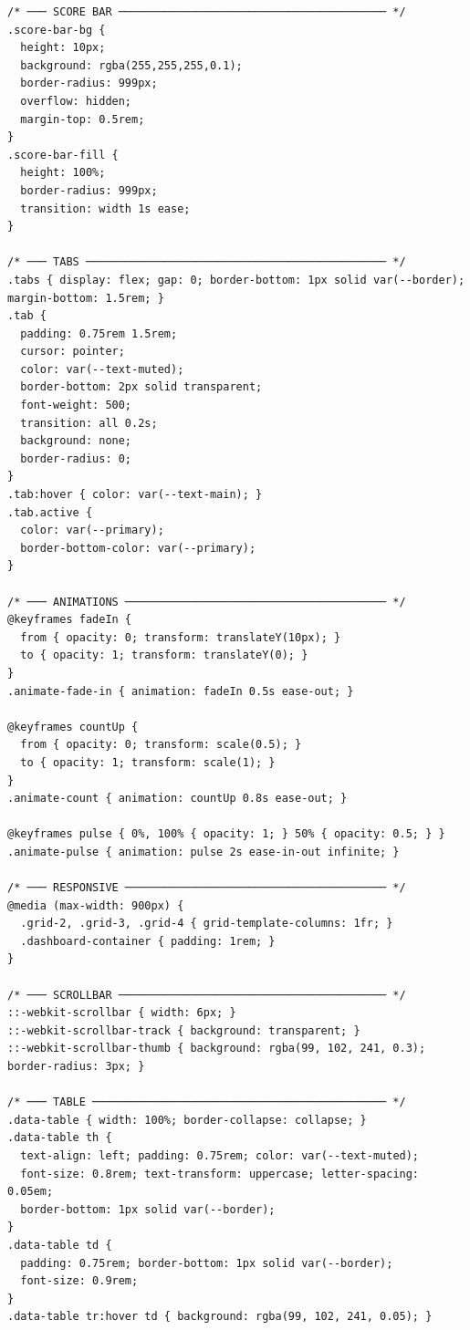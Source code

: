 \documentclass[12pt,a4paper]{report}
\begin{document}
\begin{verbatim}
/* ─── SCORE BAR ───────────────────────────────────────── */
.score-bar-bg {
  height: 10px;
  background: rgba(255,255,255,0.1);
  border-radius: 999px;
  overflow: hidden;
  margin-top: 0.5rem;
}
.score-bar-fill {
  height: 100%;
  border-radius: 999px;
  transition: width 1s ease;
}

/* ─── TABS ────────────────────────────────────────────── */
.tabs { display: flex; gap: 0; border-bottom: 1px solid var(--border); margin-bottom: 1.5rem; }
.tab {
  padding: 0.75rem 1.5rem;
  cursor: pointer;
  color: var(--text-muted);
  border-bottom: 2px solid transparent;
  font-weight: 500;
  transition: all 0.2s;
  background: none;
  border-radius: 0;
}
.tab:hover { color: var(--text-main); }
.tab.active {
  color: var(--primary);
  border-bottom-color: var(--primary);
}

/* ─── ANIMATIONS ──────────────────────────────────────── */
@keyframes fadeIn {
  from { opacity: 0; transform: translateY(10px); }
  to { opacity: 1; transform: translateY(0); }
}
.animate-fade-in { animation: fadeIn 0.5s ease-out; }

@keyframes countUp {
  from { opacity: 0; transform: scale(0.5); }
  to { opacity: 1; transform: scale(1); }
}
.animate-count { animation: countUp 0.8s ease-out; }

@keyframes pulse { 0%, 100% { opacity: 1; } 50% { opacity: 0.5; } }
.animate-pulse { animation: pulse 2s ease-in-out infinite; }

/* ─── RESPONSIVE ──────────────────────────────────────── */
@media (max-width: 900px) {
  .grid-2, .grid-3, .grid-4 { grid-template-columns: 1fr; }
  .dashboard-container { padding: 1rem; }
}

/* ─── SCROLLBAR ───────────────────────────────────────── */
::-webkit-scrollbar { width: 6px; }
::-webkit-scrollbar-track { background: transparent; }
::-webkit-scrollbar-thumb { background: rgba(99, 102, 241, 0.3); border-radius: 3px; }

/* ─── TABLE ───────────────────────────────────────────── */
.data-table { width: 100%; border-collapse: collapse; }
.data-table th {
  text-align: left; padding: 0.75rem; color: var(--text-muted);
  font-size: 0.8rem; text-transform: uppercase; letter-spacing: 0.05em;
  border-bottom: 1px solid var(--border);
}
.data-table td {
  padding: 0.75rem; border-bottom: 1px solid var(--border);
  font-size: 0.9rem;
}
.data-table tr:hover td { background: rgba(99, 102, 241, 0.05); }

\end{verbatim}
\end{document}
